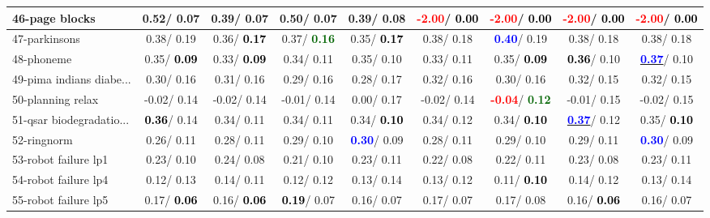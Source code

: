 \begin{table}[h]
\begin{center}
\begin{tabular}{lc|c|c|c|c|c|c|c}
46-page blocks &   0.52/  0.07 &   0.39/  0.07 &   0.50/  0.07 &   0.39/  0.08 & \textcolor{red}{\textbf{ -2.00}}/\textcolor{black}{\textbf{  0.00}} & \textcolor{red}{\textbf{ -2.00}}/\textcolor{black}{\textbf{  0.00}} & \textcolor{red}{\textbf{ -2.00}}/\textcolor{black}{\textbf{  0.00}} & \textcolor{red}{\textbf{ -2.00}}/\textcolor{black}{\textbf{  0.00}} \\ \hline
47-parkinsons &   0.38/  0.19 &   0.36/\textcolor{black}{\textbf{  0.17}} &   0.37/\textcolor{darkgreen}{\textbf{  0.16}} &   0.35/\textcolor{black}{\textbf{  0.17}} &   0.38/  0.18 & \textcolor{blue}{\textbf{  0.40}}/  0.19 &   0.38/  0.18 &   0.38/  0.18 \\
48-phoneme &   0.35/\textcolor{black}{\textbf{  0.09}} &   0.33/\textcolor{black}{\textbf{  0.09}} &   0.34/  0.11 &   0.35/  0.10 &   0.33/  0.11 &   0.35/\textcolor{black}{\textbf{  0.09}} & \textcolor{black}{\textbf{  0.36}}/  0.10 & \underline{\textcolor{blue}{\textbf{  0.37}}}/  0.10 \\
49-pima indians diabe... &   0.30/  0.16 &   0.31/  0.16 &   0.29/  0.16 &   0.28/  0.17 &   0.32/  0.16 &   0.30/  0.16 &   0.32/  0.15 &   0.32/  0.15 \\
50-planning relax &  -0.02/  0.14 &  -0.02/  0.14 &  -0.01/  0.14 &   0.00/  0.17 &  -0.02/  0.14 & \textcolor{red}{\textbf{ -0.04}}/\textcolor{darkgreen}{\textbf{  0.12}} &  -0.01/  0.15 &  -0.02/  0.15 \\
51-qsar biodegradatio... & \textcolor{black}{\textbf{  0.36}}/  0.14 &   0.34/  0.11 &   0.34/  0.11 &   0.34/\textcolor{black}{\textbf{  0.10}} &   0.34/  0.12 &   0.34/\textcolor{black}{\textbf{  0.10}} & \underline{\textcolor{blue}{\textbf{  0.37}}}/  0.12 &   0.35/\textcolor{black}{\textbf{  0.10}} \\
52-ringnorm &   0.26/  0.11 &   0.28/  0.11 &   0.29/  0.10 & \textcolor{blue}{\textbf{  0.30}}/  0.09 &   0.28/  0.11 &   0.29/  0.10 &   0.29/  0.11 & \textcolor{blue}{\textbf{  0.30}}/  0.09 \\
53-robot failure lp1 &   0.23/  0.10 &   0.24/  0.08 &   0.21/  0.10 &   0.23/  0.11 &   0.22/  0.08 &   0.22/  0.11 &   0.23/  0.08 &   0.23/  0.11 \\ \hline
54-robot failure lp4 &   0.12/  0.13 &   0.14/  0.11 &   0.12/  0.12 &   0.13/  0.14 &   0.13/  0.12 &   0.11/\textcolor{black}{\textbf{  0.10}} &   0.14/  0.12 &   0.13/  0.14 \\
55-robot failure lp5 &   0.17/\textcolor{black}{\textbf{  0.06}} &   0.16/\textcolor{black}{\textbf{  0.06}} & \textcolor{black}{\textbf{  0.19}}/  0.07 &   0.16/  0.07 &   0.17/  0.07 &   0.17/  0.08 &   0.16/\textcolor{black}{\textbf{  0.06}} &   0.16/  0.07 \\

\end{tabular}
\end{center}
\end{table}

